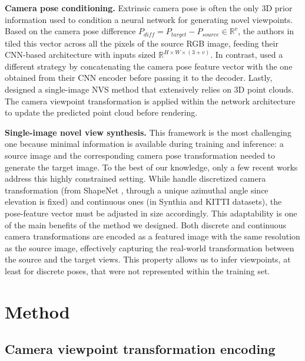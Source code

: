 \noindent\textbf{Camera pose conditioning.} Extrinsic camera pose is often the only 3D prior information used to condition a neural network for generating novel viewpoints. Based on the camera pose difference $P_{diff}=P_{target}-P_{source}\in \mathbb{R}^{v}$, the authors in \citep{sun2018multiview} tiled this vector across all the pixels of the source RGB image, feeding their \ac{CNN}-based architecture with inputs sized $\mathbb{R}^{H\times W\times (3+v)}$. In contrast, \citep{kim2020novel} used a different strategy by concatenating the camera pose feature vector with the one obtained from their \ac{CNN} encoder before passing it to the decoder. 
Lastly, \citep{wiles2020synsin} designed a single-image \ac{NVS} method that extensively relies on 3D point clouds. The camera viewpoint transformation is applied within the network architecture to update the predicted point cloud before rendering. \newline

\noindent\textbf{Single-image novel view synthesis.} This framework is the most challenging one because minimal information is available during training and inference: a source image and the corresponding camera pose transformation needed to generate the target image. To the best of our knowledge, only a few recent works \citep{sun2018multiview,kim2020novel,yu2021pixelnerf} address this highly constrained setting. While \citep{sun2018multiview, kim2020novel} handle discretized camera transformation (from ShapeNet \citep{chang2015shapenet}, through a unique azimuthal angle since elevation is fixed) and continuous ones (in Synthia \citep{ros2016synthia} and KITTI \citep{geiger2012we} datasets), the pose-feature vector must be adjusted in size accordingly. This adaptability is one of the main benefits of the method we designed. Both discrete and continuous camera transformations are encoded as a featured image with the same resolution as the source image, effectively capturing the real-world transformation between the source and the target views. This property allows us to infer viewpoints, at least for discrete poses, that were not represented within the training set. \newline

\section{Method}
\subsection{Camera viewpoint transformation encoding}
